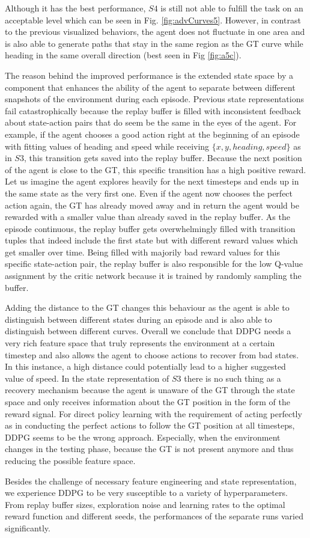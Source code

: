 Although it has the best performance, $S4$ is still not able to fulfill the task on an acceptable level which can be seen in Fig. \ref{fig:advCurves5}. However, in contrast to the previous visualized behaviors, the agent does not fluctuate in one area and is also able to generate paths that stay in the same region as the GT curve while heading in the same overall direction (best seen in Fig \ref{fig:a5c}).
\par
The reason behind the improved performance is the extended state space by a component that enhances the ability of the agent to separate between different snapshots of the environment during each episode. Previous state representations fail catastrophically because the replay buffer is filled with inconsistent feedback about state-action pairs that do seem be the same in the eyes of the agent. For example, if the agent chooses a good action right at the beginning of an episode with fitting values of heading and speed while receiving $\{x, y, heading, speed\}$ as in $S3$, this transition gets saved into the replay buffer. Because the next position of the agent is close to the GT, this specific transition has a high positive reward. Let us imagine the agent explores heavily for the next timesteps and ends up in the same state as the very first one. Even if the agent now chooses the perfect action again, the GT has already moved away and in return the agent would be rewarded with a smaller value than already saved in the replay buffer. As the episode continuous, the replay buffer gets overwhelmingly filled with transition tuples that indeed include the first state but with different reward values which get smaller over time. Being filled with majorily bad reward values for this specific state-action pair, the replay buffer is also responsible for the low Q-value assignment by the critic network because it is trained by randomly sampling the buffer.
\par
Adding the distance to the GT changes this behaviour as the agent is able to distinguish between different states during an episode and is also able to distinguish between different curves. Overall we conclude that DDPG needs a very rich feature space that truly represents the environment at a certain timestep and also allows the agent to choose actions to recover from bad states. In this instance, a high distance could potentially lead to a higher suggested value of speed. In the state representation of $S3$ there is no such thing as a recovery mechanism because the agent is unaware of the GT through the state space and only receives information about the GT position in the form of the reward signal. For direct policy learning with the requirement of acting perfectly as in conducting the perfect actions to follow the GT position at all timesteps, DDPG seems to be the wrong approach. Especially, when the environment changes in the testing phase, because the GT is not present anymore and thus reducing the possible feature space.
\par
Besides the challenge of necessary feature engineering and state representation, we experience DDPG to be very susceptible to a variety of hyperparameters. From replay buffer sizes, exploration noise and learning rates to the optimal reward function and different seeds, the performances of the separate runs varied significantly.